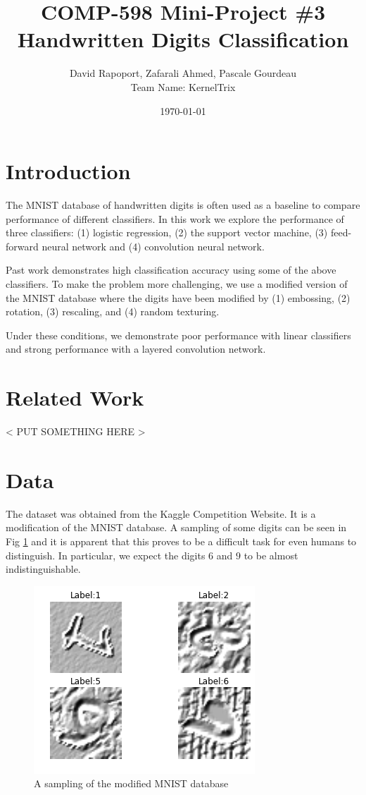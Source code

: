 \documentclass[conference]{IEEEtran}
\author{David Rapoport, Zafarali Ahmed, Pascale Gourdeau\\Team Name: KernelTrix}
\title{COMP-598 Mini-Project \#3\\Handwritten Digits Classification}
\date{\today}
\begin{document}
\maketitle

\section{Introduction}
The MNIST database\cite{MNIST_Original} of handwritten digits is often used as a baseline to compare performance of different classifiers. In this work we explore the performance of three classifiers: (1) logistic regression, (2) the support vector machine, (3) feed-forward neural network and (4) convolution neural network. 

Past work \cite{MNIST_Original} demonstrates high classification accuracy using some of the above classifiers. To make the problem more challenging, we use a modified version of the MNIST database where the digits have been modified by (1) embossing, (2) rotation, (3) rescaling, and (4) random texturing.

Under these conditions, we demonstrate poor performance with linear classifiers and strong performance with a layered convolution network.



\section{Related Work}
< PUT SOMETHING HERE >



\section{Data}

The dataset was obtained from the Kaggle Competition Website. It is a modification of the MNIST \cite{MNIST_Original} database. A sampling of some digits can be seen in Fig \ref{MNISTSample} and it is apparent that this proves to be a difficult task for even humans to distinguish. In particular, we expect the digits $6$ and $9$ to be almost indistinguishable.

\begin{figure}[h]
	\centering
	\includegraphics[scale=0.40]{sample_of_images.png}
	\caption{A sampling of the modified MNIST database}
	\label{MNISTSample}
\end{figure}
\end{document}
